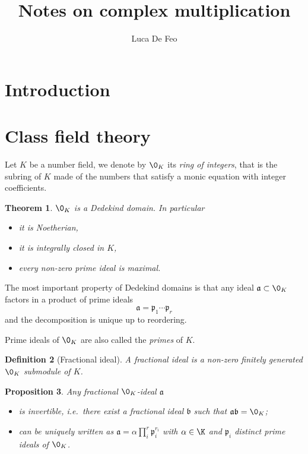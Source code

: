 \documentclass{article}
\title{Notes on complex multiplication}
\author{Luca De Feo}
\newcommand{\mf}{\mathfrak}
\newtheorem{theorem}{Theorem}
\newtheorem{definition}[theorem]{Definition}
\newtheorem{proposition}[theorem]{Proposition}
\begin{document}
\maketitle

\section{Introduction}


\section{Class field theory}

Let $K$ be a number field, we denote by $\0_K$ its \emph{ring of
  integers}, that is the subring of $K$ made of the numbers that
satisfy a monic equation with integer coefficients.

\begin{theorem}
  $\0_K$ is a Dedekind domain. In particular
  \begin{itemize}
  \item it is Noetherian,
  \item it is integrally closed in $K$,
  \item every non-zero prime ideal is maximal.
  \end{itemize}
\end{theorem}

The most important property of Dedekind domains is that any ideal
$\mf{a}\subset\0_K$ factors in a product of prime ideals
\begin{equation}
  \label{eq:4}
  \mf{a} = \mf{p}_1\cdots\mf{p}_r
\end{equation}
and the decomposition is unique up to reordering.

Prime ideals of $\0_K$ are also called the \emph{primes} of $K$.

\begin{definition}[Fractional ideal]
  A \emph{fractional ideal} is a non-zero finitely generated $\0_K$
  submodule of $K$.
\end{definition}

\begin{proposition}
  Any fractional $\0_K$-ideal $\mf{a}$
  \begin{itemize}
  \item is invertible, i.e.\ there exist a fractional ideal $\mf{b}$
    such that $\mf{a}\mf{b}=\0_K$;
  \item can be uniquely written as $\mf{a} =
    \alpha\prod_i^r\mf{p}_i^{r_i}$ with $\alpha\in\K$ and $\mf{p}_i$
    distinct prime ideals of $\0_K$.
  \end{itemize}
\end{proposition}
\end{document}
